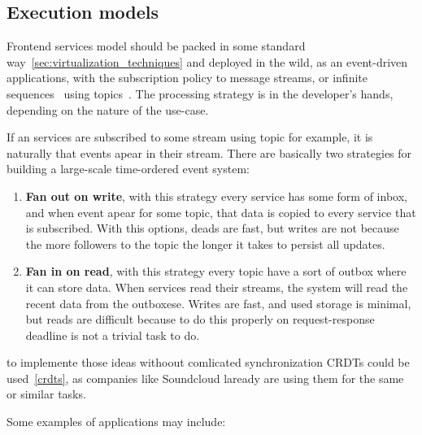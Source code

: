 \subsection{Execution models}\label{sec:execution_models}
%
Frontend services model should be packed in some standard way~\ref{sec:virtualization_techniques} and deployed in the wild, as an event-driven applications, with the subscription policy to message streams, or infinite sequences~\cite{Rutten03} using topics~\cite{inproceedingsBeck}. The processing strategy is in the developer's hands, depending on the nature of the use-case. 

If an services are subscribed to some stream using topic for example, it is naturally that events apear in their stream. There are basically two strategies for building a large-scale time-ordered event system:

\begin{enumerate}[start=1,label={(\bfseries \arabic*)}]
	\item \textbf{Fan out on write}, with this strategy every service has some form of inbox, and when event apear for some topic, that data is copied to every service that is subscribed. With this options, deads are fast, but writes are not because the more followers to the topic the longer it takes to persist all updates. 
	\item \textbf{Fan in on read}, with this strategy every topic have a sort of outbox where it can store data. When services read their streams, the system will read the recent data from the outboxese. Writes are fast, and used storage is minimal, but reads are difficult because to do this properly on request-response deadline is not a trivial task to do.
\end{enumerate}

\noindent 
to implemente those ideas withoout comlicated synchronization CRDTs could be used~\ref{crdts}, as companies like Soundcloud laready are using them for the same or similar tasks.

Some examples of applications may include:


